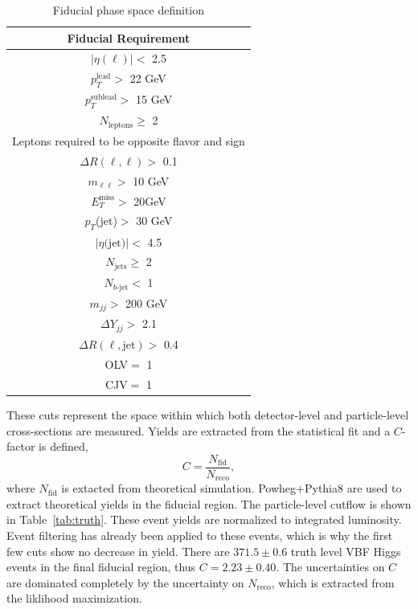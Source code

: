 \begin{table}[!ht]
\centering
\begin{tabular}{|c|}
\hline
Fiducial Requirement \\
\hline
$|\eta(\ell)|<$ 2.5 \\
$p_T^{\text{lead}}>$ 22 GeV \\
$p_T^{\text{sublead}}>$ 15 GeV \\
$N_{\text{leptons}}\geq$ 2\\
Leptons required to be opposite flavor and sign \\
$\Delta R(\ell,\ell) >$ 0.1 \\
$m_{\ell\ell}>$ 10 GeV \\
$E_T^{\text{miss}}>$ 20GeV \\
$p_T$(jet)$>$ 30 GeV \\
$|\eta\text{(jet)}|<$ 4.5\\ 
$N_{\text{jets}} \geq $ 2\\
$N_{b\text{-jet}} < $ 1\\
$m_{jj} >$ 200 GeV \\
$\Delta Y_{jj}>$ 2.1\\
$\Delta R(\ell,\text{jet})>$ 0.4\\
OLV$=$ 1 \\
CJV$=$ 1 \\
\hline
\end{tabular}
\caption{Fiducial phase space definition}
\label{tab:fiducial}
\end{table}
These cuts represent the space within which both detector-level and particle-level cross-sections are measured. Yields are extracted from the statistical fit and a $C$-factor is defined, 
\begin{equation}
C = \frac{N_\text{fid}}{N_{\text{reco}}},
\end{equation}
where $N_\text{fid}$ is extacted from theoretical simulation. Powheg$+$Pythia8 are used to extract theoretical yields in the fiducial region. The particle-level cutflow is shown in Table~\ref{tab:truth}. These event yields are normalized to integrated luminosity. Event filtering has already been applied to these events, which is why the first few cuts show no decrease in yield.  There are $371.5\pm0.6$ truth level VBF Higgs events in the final fiducial region, thus $C=2.23\pm 0.40$. The uncertainties on $C$ are dominated completely by the uncertainty on $N_{\text{reco}}$, which is extracted from the liklihood maximization.  

